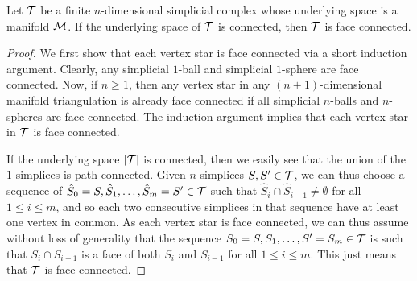 \documentclass[10pt,letterpaper]{article}
\newcommand\cye[1]{%
  \protect\leavevmode
  \begingroup
    \color{red!35!yellow}%
    #1%
  \endgroup
}
\begin{document}
\begin{lemma}\label{lemma:connectivity}
    Let ${\mathcal T}$ be a finite $n$-dimensional simplicial complex whose underlying space is a manifold ${\mathcal M}$.
    If the underlying space of ${\mathcal T}$ is connected, then ${\mathcal T}$ is \cye{face} connected.
\end{lemma}
\begin{proof}
    We first show that each vertex star is \cye{face} connected via a short induction argument.
    Clearly, any simplicial $1$-ball and simplicial $1$-sphere are \cye{face} connected. 
    Now, if $n \geq 1$, then any vertex star in any $(n+1)$-dimensional manifold triangulation is already \cye{face} connected if all simplicial $n$-balls and $n$-spheres are \cye{face} connected.
    The induction argument implies that each vertex star in ${\mathcal T}$ is \cye{face} connected.

    If the underlying space $\left| {\mathcal T} \right|$ is connected, 
    then we easily see that the union of the $1$-simplices is path-connected.
    Given $n$-simplices $S,S' \in {\mathcal T}$, 
    we can thus choose a sequence of $\hat S_0=S,\hat S_1,\dots,\hat S_m=S' \in {\mathcal T}$ such that $\hat S_{i} \cap \hat S_{i-1} \neq \emptyset$ for all $1 \leq i \leq m$, and so each two consecutive simplices in that sequence have at least one vertex in common. 
    As each vertex star is \cye{face} connected, 
    we can thus assume without loss of generality that the sequence $S_0=S,S_1,\dots,S'=S_m \in {\mathcal T}$ 
    is such that $S_{i} \cap S_{i-1}$ is a face of both $S_{i}$ and $S_{i-1}$ for all $1 \leq i \leq m$.
    This just means that ${\mathcal T}$ is \cye{face} connected. 
\end{proof}
\end{document}
